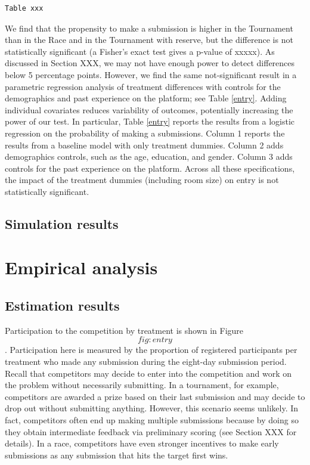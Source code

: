\documentclass[12pt,]{article}
\begin{document}
\begin{verbatim}
Table xxx
\end{verbatim}

We find that the propensity to make a submission is higher in the
Tournament than in the Race and in the Tournament with reserve, but the
difference is not statistically significant (a Fisher's exact test gives
a p-value of xxxxx). As discussed in Section XXX, we may not have enough
power to detect differences below 5 percentage points. However, we find
the same not-significant result in a parametric regression analysis of
treatment differences with controls for the demographics and past
experience on the platform; see Table \ref{entry}. Adding individual
covariates reduces variability of outcomes, potentially increasing the
power of our test. In particular, Table \ref{entry} reports the results
from a logistic regression on the probability of making a submissions.
Column 1 reports the results from a baseline model with only treatment
dummies. Column 2 adds demographics controls, such as the age,
education, and gender. Column 3 adds controls for the past experience on
the platform. Across all these specifications, the impact of the
treatment dummies (including room size) on entry is not statistically
significant.

\subsection{Simulation results}\label{simulation-results}

\section{Empirical analysis}\label{empirical-analysis}

\subsection{Estimation results}\label{estimation-results-1}

Participation to the competition by treatment is shown in Figure
\[fig:entry\]. Participation here is measured by the proportion of
registered participants per treatment who made any submission during the
eight-day submission period. Recall that competitors may decide to enter
into the competition and work on the problem without necessarily
submitting. In a tournament, for example, competitors are awarded a
prize based on their last submission and may decide to drop out without
submitting anything. However, this scenario seems unlikely. In fact,
competitors often end up making multiple submissions because by doing so
they obtain intermediate feedback via preliminary scoring (see Section
XXX for details). In a race, competitors have even stronger incentives
to make early submissions as any submission that hits the target first
wins.
\end{document}
